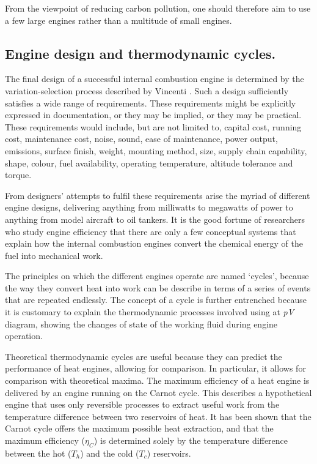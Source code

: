 From the viewpoint of reducing carbon pollution, one should therefore aim to use
a few large engines rather than a multitude of small engines.

\subsection{Engine design and thermodynamic cycles.} \label{par:efficiency}

The final design of a successful internal combustion engine is determined by the
variation-selection process described by Vincenti \autocite{Vincenti1990}. Such
a design sufficiently satisfies a wide range of requirements. These requirements
might be explicitly expressed in documentation, or they may be implied, or they
may be practical. These requirements would include, but are not limited to,
capital cost, running cost, maintenance cost, noise, sound, ease of maintenance, power
output, emissions, surface finish, weight, mounting method, size, supply chain
capability, shape, colour, fuel availability, operating temperature, altitude
tolerance and torque.

From designers' attempts to fulfil these requirements arise the myriad of
different engine designs, delivering anything from milliwatts to megawatts of
power to anything from model aircraft to oil tankers. It is the good fortune of
researchers who study engine efficiency that there are only a few conceptual
systems that explain how the internal combustion engines convert the chemical
energy of the fuel into mechanical work.

The principles on which the different engines operate are named `cycles',
because the way they convert heat into work can be describe in terms of a series
of events that are repeated endlessly. The concept of a cycle is
further entrenched because it is customary to explain the thermodynamic
processes involved using at \textit{pV} diagram, showing the changes of state of
the working fluid during engine operation.

Theoretical thermodynamic cycles are useful because they can predict the
performance of heat engines, allowing for comparison. In particular, it allows
for comparison with theoretical maxima. The maximum efficiency of a heat engine
is delivered by an engine running on the Carnot cycle. This describes a
hypothetical engine that uses only reversible processes to extract useful work
from the temperature difference between two reservoirs of heat. It has been
shown that the Carnot cycle offers the maximum possible heat extraction, and
that the maximum efficiency (\(\eta_{C}\)) is determined solely by the temperature
difference between the hot (\(T_h\)) and the cold (\(T_c\)) reservoirs.

